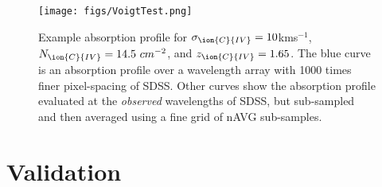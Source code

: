 \documentclass[fleqn,usenatbib]{mnras}
\newcommand{\civ}{\ion{C}{IV}}
\newcommand{\nciv}{N_{\civ}} %
\newcommand{\zciv}{z_{\civ}}
\newcommand{\sciv}{\sigma_{\civ}}
\newcommand{\kms}{kms$^{-1}$} %
\newcommand{\spb}[1]{\textcolor{red}{[\bf SPB: #1]}}
\newcommand{\rmon}[1]{\textcolor{rez}{[\bf RM: #1]}}
\begin{document}
%


\begin{figure}
  \centering
  \texttt{[image: figs/VoigtTest.png]}
  \caption{ Example absorption profile for $\sciv=10$\kms, $\nciv=14.5~cm^{-2}$, and
  $\zciv=1.65$. The blue curve is an absorption profile over a wavelength array with 1000 times
  finer pixel-spacing of SDSS. Other curves show the absorption profile evaluated at the \emph{observed}
  wavelengths of SDSS, but sub-sampled and then averaged using a fine grid of nAVG sub-samples.}
  \label{fig:voigtTest}
\end{figure}


\section{Validation}
\label{sec:validation}
\end{document}
